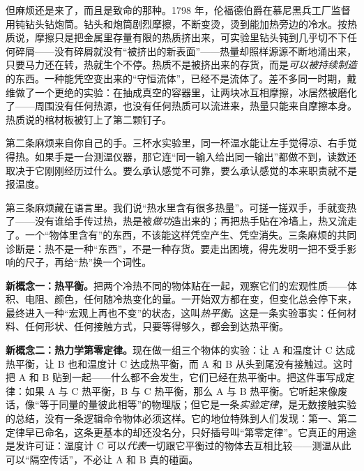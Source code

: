 但麻烦还是来了，而且是致命的那种。1798 年，伦福德伯爵在慕尼黑兵工厂监督用钝钻头钻炮筒。钻头和炮筒剧烈摩擦，不断变烫，烫到能加热旁边的冷水。按热质说，摩擦只是把金属里存量有限的热质挤出来，可实验里钻头钝到几乎切不下任何碎屑——没有碎屑就没有“被挤出的新表面”——热量却照样源源不断地涌出来，只要马力还在转，热就生个不停。热质不是被挤出来的存货，而是\emph{可以被持续制造}的东西。一种能凭空变出来的“守恒流体”，已经不是流体了。差不多同一时期，戴维做了一个更绝的实验：在抽成真空的容器里，让两块冰互相摩擦，冰居然被磨化了——周围没有任何热源，也没有任何热质可以流进来，热量只能来自摩擦本身。热质说的棺材板被钉上了第二颗钉子。

第二条麻烦来自你自己的手。三杯水实验里，同一杯温水能让左手觉得凉、右手觉得热。如果手是一台测温仪器，那它连“同一输入给出同一输出”都做不到，读数还取决于它刚刚经历过什么。要么承认感觉不可靠，要么承认感觉的本来职责就不是报温度。

第三条麻烦藏在语言里。我们说“热水里含有很多热量”。可搓一搓双手，手就变热了——没有谁给手传过热，热是被\emph{做功}造出来的；再把热手贴在冷墙上，热又流走了。一个“物体里含有”的东西，不该能这样凭空产生、凭空消失。三条麻烦的共同诊断是：热不是一种“东西”，不是一种存货。要走出困境，得先发明一把不受手影响的尺子，再给“热”换一个词性。


\begin{mainline}
\textbf{新概念一：热平衡。}把两个冷热不同的物体贴在一起，观察它们的宏观性质——体积、电阻、颜色，任何随冷热变化的量。一开始双方都在变，但变化总会停下来，最终进入一种“宏观上再也不变”的状态，这叫\emph{热平衡}。这是一条实验事实：任何材料、任何形状、任何接触方式，只要等得够久，都会到达热平衡。

\textbf{新概念二：热力学第零定律。}现在做一组三个物体的实验：让 A 和温度计 C 达成热平衡，让 B 也和温度计 C 达成热平衡，而 A 和 B 从头到尾没有接触过。这时把 A 和 B 贴到一起——什么都不会发生，它们已经在热平衡中。把这件事写成定律：如果 A 与 C 热平衡，B 与 C 热平衡，那么 A 与 B 热平衡。它听起来像废话，像“等于同量的量彼此相等”的物理版；但它是一条\emph{实验定律}，是无数接触实验的总结，没有一条逻辑命令物体必须这样。它的地位特殊到人们发现：第一、第二定律早已命名，这条更基本的却还没名分，只好插号叫“第零定律”。它真正的用途是发许可证：温度计 C 可以\emph{代表}一切跟它平衡过的物体去互相比较——测温从此可以“隔空传话”，不必让 A 和 B 真的碰面。
\end{mainline}

\begin{center}
\end{center}

